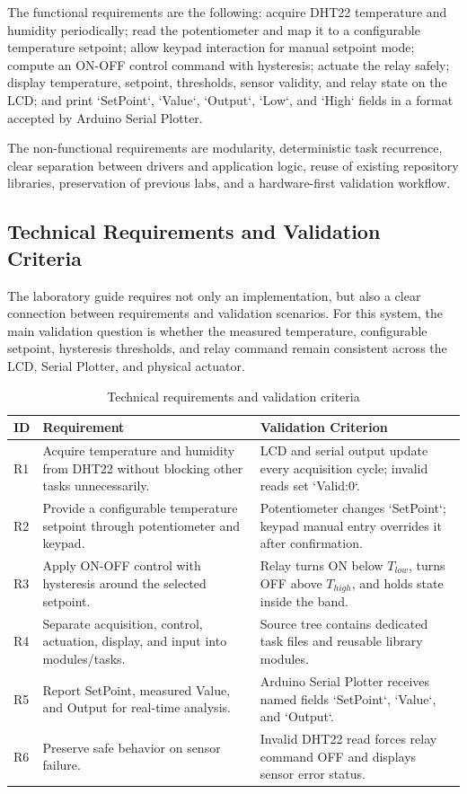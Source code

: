 The functional requirements are the following: acquire DHT22 temperature and humidity periodically; read the potentiometer and map it to a configurable temperature setpoint; allow keypad interaction for manual setpoint mode; compute an ON-OFF control command with hysteresis; actuate the relay safely; display temperature, setpoint, thresholds, sensor validity, and relay state on the LCD; and print `SetPoint`, `Value`, `Output`, `Low`, and `High` fields in a format accepted by Arduino Serial Plotter.

The non-functional requirements are modularity, deterministic task recurrence, clear separation between drivers and application logic, reuse of existing repository libraries, preservation of previous labs, and a hardware-first validation workflow.

\subsection{Technical Requirements and Validation Criteria}

The laboratory guide requires not only an implementation, but also a clear connection between requirements and validation scenarios. For this system, the main validation question is whether the measured temperature, configurable setpoint, hysteresis thresholds, and relay command remain consistent across the LCD, Serial Plotter, and physical actuator.

\begin{table}[H]
\centering
\begin{tabular}{|p{1.0cm}|p{7.4cm}|p{5.2cm}|}
\hline
\textbf{ID} & \textbf{Requirement} & \textbf{Validation Criterion} \\
\hline
R1 & Acquire temperature and humidity from DHT22 without blocking other tasks unnecessarily. & LCD and serial output update every acquisition cycle; invalid reads set `Valid:0`. \\
\hline
R2 & Provide a configurable temperature setpoint through potentiometer and keypad. & Potentiometer changes `SetPoint`; keypad manual entry overrides it after confirmation. \\
\hline
R3 & Apply ON-OFF control with hysteresis around the selected setpoint. & Relay turns ON below \(T_{low}\), turns OFF above \(T_{high}\), and holds state inside the band. \\
\hline
R4 & Separate acquisition, control, actuation, display, and input into modules/tasks. & Source tree contains dedicated task files and reusable library modules. \\
\hline
R5 & Report SetPoint, measured Value, and Output for real-time analysis. & Arduino Serial Plotter receives named fields `SetPoint`, `Value`, and `Output`. \\
\hline
R6 & Preserve safe behavior on sensor failure. & Invalid DHT22 read forces relay command OFF and displays sensor error status. \\
\hline
\end{tabular}
\caption{Technical requirements and validation criteria}
\label{tab:requirements_validation}
\end{table}

